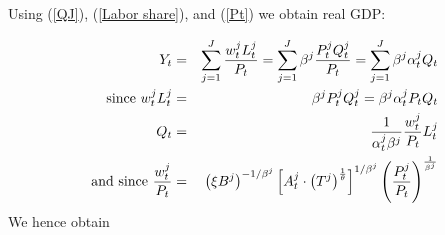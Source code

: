 \documentclass{article}
\begin{document}
Using (\ref{QJ}), (\ref{Labor share}), and (\ref{Pt}) we obtain real GDP:

\begin{eqnarray*}
Y_{t} &=&\sum_{j=1}^{J}\frac{w_{t}^{j}L_{t}^{j}}{P_{t}}=\sum_{j=1}^{J}\beta
^{j}\frac{P_{t}^{j}Q_{t}^{j}}{P_{t}}=\sum_{j=1}^{J}\beta ^{j}\alpha
_{t}^{j}Q_{t} \\
\text{since }w_{t}^{j}L_{t}^{j} &=&\beta ^{j}P_{t}^{j}Q_{t}^{j}=\beta
^{j}\alpha _{t}^{j}P_{t}Q_{t} \\
Q_{t} &=&\frac{1}{\alpha _{t}^{j}\beta ^{j}}\frac{w_{t}^{j}}{P_{t}}L_{t}^{j}
\\
\text{and since }\frac{w_{t}^{j}}{P_{t}} &=&\left( \xi B^{j}\right)
^{-1/\beta ^{j}}\left[ A_{t}^{j}\cdot \left( T^{j}\right) ^{\frac{1}{\theta }%
}\right] ^{1/\beta ^{j}}\left( \frac{P_{t}^{j}}{P_{t}}\right) ^{\frac{1}{%
\beta ^{j}}}
\end{eqnarray*}%
We hence obtain%
\end{document}
